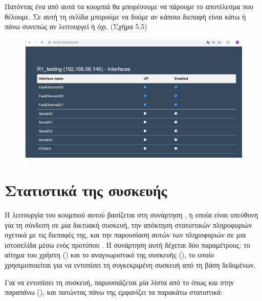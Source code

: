 \FloatBarrier

Πατόντας ένα από αυτά τα κουμπιά θα μπορέσουμε να πάρουμε το αποτέλεσμα που θέλουμε.
Σε αυτή τη σελίδα μπορούμε να δούμε αν κάποια διεπαφή είναι κάτω ή πάνω συνεπώς αν λειτουργεί ή όχι.
(Σχήμα 5.5)

\begin{figure}[htb]
	\centering
	\includegraphics[width=1.2\textwidth]{graphics/interfaces.png}
	\caption{}
\end{figure}



\section{Στατιστικά της συσκευής}

Η λειτουργία του κουμπιού αυτού βασίζεται στη συνάρτηση , 
η οποία είναι υπεύθυνη για τη σύνδεση σε μια δικτυακή συσκευή, 
την απόκτηση στατιστικών πληροφοριών σχετικά με τις 
διεπαφές της, και την παρουσίαση αυτών των πληροφοριών 
σε μια ιστοσελίδα μέσω ενός προτύπου . Η συνάρτηση αυτή 
δέχεται δύο παραμέτρους: το αίτημα του χρήστη () 
και το αναγνωριστικό της συσκευής (), 
το οποίο χρησιμοποιείται για να εντοπίσει τη συγκεκριμένη 
συσκευή από τη βάση δεδομένων.

Για να εντοπίσει τη συσκευή, παρουσιάζεται μία λίστα από το 
 όπως και στην παραπάνω (), 
και πατώντας πάνω της εμφανίζει τα παρακάτω στατιστικά:

\FloatBarrier

